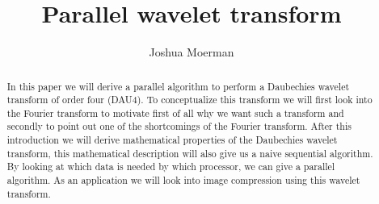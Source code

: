 \documentclass[a4paper, 11pt]{amsart}
\title{Parallel wavelet transform}
\author{Joshua Moerman}
\begin{document}
\begin{abstract}
In this paper we will derive a parallel algorithm to perform a Daubechies wavelet transform of order four (DAU4). To conceptualize this transform we will first look into the Fourier transform to motivate first of all why we want such a transform and secondly to point out one of the shortcomings of the Fourier transform. After this introduction we will derive mathematical properties of the Daubechies wavelet transform, this mathematical description will also give us a naive sequential algorithm. By looking at which data is needed by which processor, we can give a parallel algorithm. As an application we will look into image compression using this wavelet transform.
\end{abstract}
\maketitle
\tableofcontents







\nocite{*}

{}
\end{document}
